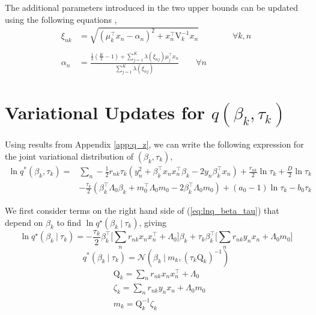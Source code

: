 \documentclass[twoside,11pt]{article}
\newcommand\given[1][]{\:#1\vert\:}
\newcommand{\transpose}[1]{#1^{\intercal}}
\begin{document}
The additional parameters introduced in the two upper bounds can be updated using the following equations \parencite{Depraetere:17},
\begin{align*}
    \xi_{nk} & = \sqrt{\left(\mu_k^{\intercal}x_n - \alpha_n \right)^2 + x_n^{\intercal} \mathrm{V}_k^{-1} x_n} \qquad \qquad \forall k, n \\ \\
    \alpha_n & = \frac{\frac{1}{2}\left( \frac{K}{2} - 1\right) + \sum_{j = 1}^K \lambda \left( \xi_{nj} \right)\mu_j^{\intercal} x_n}{\sum_{j=1}^{K} \lambda \left( \xi_{nj}\right)} \qquad \forall n
\end{align*}


\section{Variational Updates for $q(\beta_k, \tau_k)$} \label{app:beta_tau}  
Using results from Appendix \ref{app:q_z}, we can write the following expression for the joint variational distribution of $(\beta_k, \tau_k)$, 
\begin{equation} \label{eq:lnq_beta_tau}
\begin{split}
	\ln q^{*}(\beta_k, \tau_k) = & \sum_{n} -\frac{1}{2} r_{nk} \tau_k \left( y_n^2 + \transpose{\beta_k} x_n \transpose{x_n} \beta_k - 2y_n \transpose{\beta_k} x_n \right) + \frac{r_{nk}}{2} \ln \tau_k + \frac{D}{2} \ln \tau_k \\
	& - \frac{\tau_k}{2} \left( \transpose{\beta_k} \Lambda_0 \beta_k + \transpose{m_0} \Lambda_0 m_0 - 2\transpose{\beta_k}\Lambda_0m_0\right) + (a_0 - 1) \ln \tau_k - b_0 \tau_k
\end{split}
\end{equation}

We first consider terms on the right hand side of (\ref{eq:lnq_beta_tau}) that depend on $\beta_k$ to find $\ln q^{\star}(\beta_k \given \tau_k)$, giving
\begin{equation} \label{eq:lnq_beta}
	\ln q^{\star}(\beta_k \given \tau_k) = -\frac{\tau_k}{2} \transpose{\beta_k} \Big[ \sum_{n}r_{nk} x_n \transpose{x_n} + \Lambda_0 \Big] \beta_k + \tau_k \transpose{\beta_k} \Big[ \sum_{n} r_{nk}y_n x_n + \Lambda_0 m_0 \Big]
\end{equation}
\begin{equation} \label{q_beta}
	q^{*}(\beta_k \given \tau_k) = \mathcal{N}\left(\beta_k \given m_k, (\tau_k \mathrm{Q}_k)^{-1} \right)
\end{equation}
\begin{equation} \label{eq:beta_params}
\begin{split}
    & \mathrm{Q}_k = \sum_{n} r_{nk} x_n \transpose{x_n} + \Lambda_0 \\
 	& \zeta_k = \sum_{n} r_{nk} y_n x_n + \Lambda_0 m_0 \\
	& m_k = \mathrm{Q}_k^{-1}  \zeta_k 
\end{split}
\end{equation}
\end{document}
